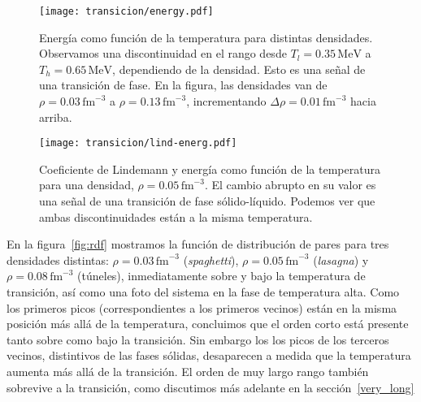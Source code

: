 \begin{figure}[h!]  \centering
\texttt{[image: transicion/energy.pdf]}
\caption{Energía como función de la temperatura para distintas densidades.
  Observamos una discontinuidad en el rango desde $T_l=0.35\,\text{MeV}$ a $T_h=0.65\,\text{MeV}$, dependiendo de la densidad.
  Esto es una señal de una transición de fase.
  En la figura, las densidades van de $\rho=0.03\,\text{fm}^{-3}$ a $\rho=0.13\,\text{fm}^{-3}$, incrementando $\Delta\rho=0.01\,\text{fm}^{-3}$ hacia arriba.}
\label{fig:energy}
\end{figure}

\begin{figure}[h!]  \centering
\texttt{[image: transicion/lind-energ.pdf]}
\caption{Coeficiente de Lindemann y energía como función de la temperatura para una densidad, $\rho=0.05\,\text{fm}^{-3}$.
  El cambio abrupto en su valor es una señal de una transición de fase sólido-líquido.
  Podemos ver que ambas discontinuidades están a la misma temperatura.}
\label{fig:lind-energ}
\end{figure}

En la figura~\ref{fig:rdf} mostramos la función de distribución de pares para tres densidades distintas: $\rho=0.03\,\text{fm}^{-3}$ (\emph{spaghetti}), $\rho=0.05\,\text{fm}^{-3}$ (\emph{lasagna}) y $\rho=0.08\,\text{fm}^{-3}$ (túneles), inmediatamente sobre y bajo la temperatura de transición, así como una foto del sistema en la fase de temperatura alta.
Como los primeros picos (correspondientes a los primeros vecinos) están en la misma posición más allá de la temperatura, concluimos que el orden corto está presente tanto sobre como bajo la transición.
Sin embargo los los picos de los terceros vecinos, distintivos de las fases sólidas, desaparecen a medida que la temperatura aumenta más allá de la transición.
El orden de muy largo rango también sobrevive a la transición, como discutimos más adelante en la sección~\ref{very_long}

